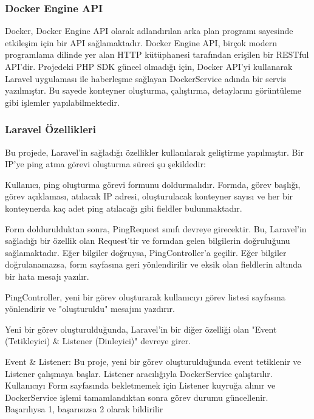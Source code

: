 \subsubsection{Docker Engine API}

Docker, Docker Engine API olarak adlandırılan arka plan programı sayesinde etkileşim için bir API sağlamaktadır. Docker Engine API, birçok modern programlama dilinde yer alan HTTP kütüphanesi tarafından erişilen bir RESTful API'dir. Projedeki PHP SDK güncel olmadığı için, Docker API'yi kullanarak Laravel uygulaması ile haberleşme sağlayan DockerService adında bir servis yazılmıştır. Bu sayede konteyner oluşturma, çalıştırma, detaylarını görüntüleme gibi işlemler yapılabilmektedir.

\subsubsection{Laravel Özellikleri}

Bu projede, Laravel'in sağladığı özellikler kullanılarak geliştirme yapılmıştır. Bir IP'ye ping atma görevi oluşturma süreci şu şekildedir:

Kullanıcı, ping oluşturma görevi formunu doldurmalıdır. Formda, görev başlığı, görev açıklaması, atılacak IP adresi, oluşturulacak konteyner sayısı ve her bir konteynerda kaç adet ping atılacağı gibi fieldler bulunmaktadır.

Form doldurulduktan sonra, PingRequest sınıfı devreye girecektir. Bu, Laravel'in sağladığı bir özellik olan Request'tir ve formdan gelen bilgilerin doğruluğunu sağlamaktadır. Eğer bilgiler doğruysa, PingController'a geçilir. Eğer bilgiler doğrulanamazsa, form sayfasına geri yönlendirilir ve eksik olan fieldlerin altında bir hata mesajı yazılır.

PingController, yeni bir görev oluşturarak kullanıcıyı görev listesi sayfasına yönlendirir ve "oluşturuldu" mesajını yazdırır.

Yeni bir görev oluşturulduğunda, Laravel'in bir diğer özelliği olan "Event (Tetikleyici) \& Listener (Dinleyici)" devreye girer.

Event \& Listener: Bu proje, yeni bir görev oluşturulduğunda event tetiklenir ve Listener çalışmaya başlar. Listener aracılığıyla DockerService çalıştırılır. Kullanıcıyı Form sayfasında bekletmemek için Listener kuyruğa alınır ve DockerService işlemi tamamlandıktan sonra görev durumu güncellenir. Başarılıysa 1, başarısızsa 2 olarak bildirilir
